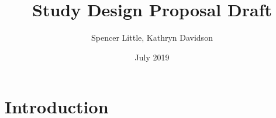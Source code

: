 \documentclass{article}
\title{Study Design Proposal Draft}
\author{Spencer Little, Kathryn Davidson}
\date{July 2019}
\begin{document}
\maketitle

\section{Introduction}
\end{document}
